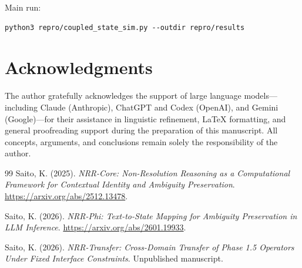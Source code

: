 \documentclass[11pt,a4paper]{article}
\begin{document}
Main run:
\begin{lstlisting}
python3 repro/coupled_state_sim.py --outdir repro/results
\end{lstlisting}

\section*{Acknowledgments}

The author gratefully acknowledges the support of large language
models---including Claude (Anthropic), ChatGPT and Codex (OpenAI), and Gemini (Google)---for their assistance in linguistic refinement,
LaTeX formatting, and general proofreading support during the
preparation of this manuscript.
All concepts, arguments, and conclusions remain solely the
responsibility of the author.

\begin{thebibliography}{99}
Saito, K. (2025).
\textit{NRR-Core: Non-Resolution Reasoning as a Computational Framework for Contextual Identity and Ambiguity Preservation}.
\url{https://arxiv.org/abs/2512.13478}.

Saito, K. (2026).
\textit{NRR-Phi: Text-to-State Mapping for Ambiguity Preservation in LLM Inference}.
\url{https://arxiv.org/abs/2601.19933}.

Saito, K. (2026).
\textit{NRR-Transfer: Cross-Domain Transfer of Phase 1.5 Operators Under Fixed Interface Constraints}.
Unpublished manuscript.
\end{thebibliography}
\end{document}
